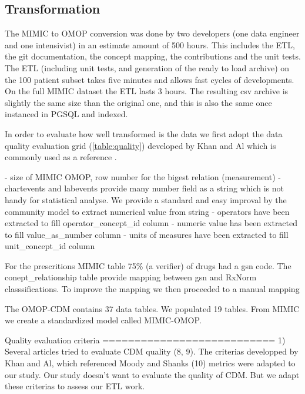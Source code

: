 \subsection{Transformation}

The MIMIC to OMOP conversion was done by two developers (one data engineer and
one intensivist) in an estimate amount of 500 hours. This includes the ETL, the
git documentation, the concept mapping, the contributions and the unit tests.
The ETL (including unit tests, and generation of the ready to load archive) on
the 100 patient subset takes five minutes and allows fast cycles of
developments. On the full MIMIC dataset the ETL lasts 3 hours. 
The resulting csv archive is slightly the same size than the original one, and
this is also the same once instanced in PGSQL and indexed.


In order to evaluate how well transformed is the data we first adopt the data
quality evaluation grid (\ref{table:quality}) developed by Khan and Al
\cite{khan-quality} which is commonly used as a reference \cite{moody-quality}.

- size of MIMIC OMOP, row number for the bigest relation (measurement)
- chartevents and labevents provide many number field as a string which is not handy for statistical analyse. We provide a standard and easy improval by the community model to extract numerical value from string
	- operators have been extracted to fill operator\_concept\_id column
	- numeric value has been extracted to fill value\_as\_number column
	- units of measures have been extracted to fill unit\_concept\_id column

  For the prescritions MIMIC table 75\% (a verifier) of drugs had a gsn code. The conept\_relationship table provide mapping between gsn and RxNorm classsifications. To improve the mapping we then proceeded to a manual mapping

The OMOP-CDM contains 37 data tables. We populated 19 tables.
From MIMIC we create a standardized model called MIMIC-OMOP.

Quality evaluation criteria
===========================
1)
Several articles tried to evaluate CDM quality (8, 9).
The criterias developped by Khan and Al, which referenced Moody and Shanks (10) metrics were adapted to our study.
Our study doesn't want to evaluate the quality of CDM. But we adapt these criterias to assess our ETL work.

